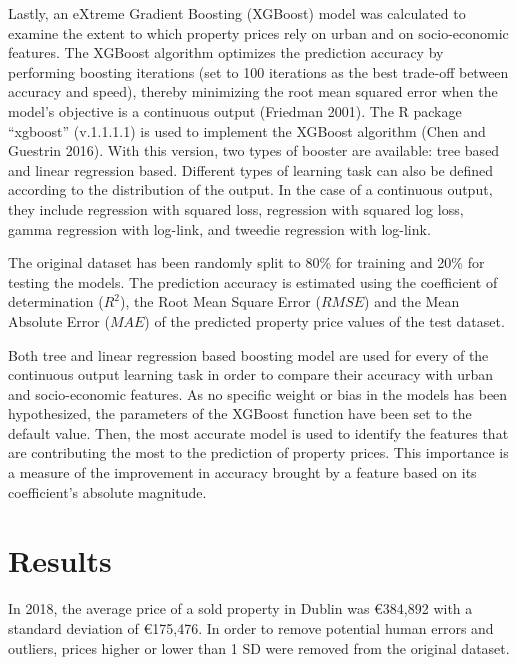 \documentclass[conference,final,]{IEEEtran}
\begin{document}
Lastly, an eXtreme Gradient Boosting (XGBoost) model was calculated to examine the extent to which property prices rely on urban and on socio-economic features. The XGBoost algorithm optimizes the prediction accuracy by performing boosting iterations (set to 100 iterations as the best trade-off between accuracy and speed), thereby minimizing the root mean squared error when the model's objective is a continuous output (Friedman 2001). The R package ``xgboost'' (v.1.1.1.1) is used to implement the XGBoost algorithm (Chen and Guestrin 2016). With this version, two types of booster are available: tree based and linear regression based. Different types of learning task can also be defined according to the distribution of the output. In the case of a continuous output, they include regression with squared loss, regression with squared log loss, gamma regression with log-link, and tweedie regression with log-link.

The original dataset has been randomly split to 80\% for training and 20\% for testing the models. The prediction accuracy is estimated using the coefficient of determination (\(R^2\)), the Root Mean Square Error (\(RMSE\)) and the Mean Absolute Error (\(MAE\)) of the predicted property price values of the test dataset.

Both tree and linear regression based boosting model are used for every of the continuous output learning task in order to compare their accuracy with urban and socio-economic features. As no specific weight or bias in the models has been hypothesized, the parameters of the XGBoost function have been set to the default value. Then, the most accurate model is used to identify the features that are contributing the most to the prediction of property prices. This importance is a measure of the improvement in accuracy brought by a feature based on its coefficient's absolute magnitude.

\hypertarget{results}{%
\section{Results}\label{results}}

In 2018, the average price of a sold property in Dublin was €384,892 with a standard deviation of €175,476. In order to remove potential human errors and outliers, prices higher or lower than 1 SD were removed from the original dataset.
\end{document}
